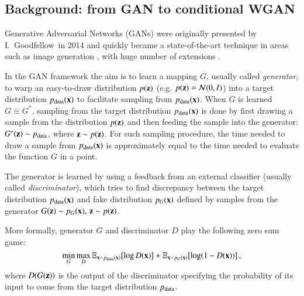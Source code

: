 \subsection{Background: from GAN to conditional WGAN}

Generative Adversarial Networks (GANs) were originally presented by I.~Goodfellow~\etal in 2014 \cite{goodfellow2014generative} and quickly became a state-of-the-art technique in areas such as image generation \cite{radford2015unsupervised}, with huge number of extensions \cite{IsolaZZE16,CycleGAN2017,wang2018video}.

In the GAN framework the aim is to learn a mapping $G$, usually called \textit{generator}, to warp an easy-to-draw distribution $p(\mathbf{z})$ (e.g. $p(\mathbf{z}) = \mathcal{N}(0, I)$) into a target distribution $p_{\text{data}}(\mathbf{x})$ to facilitate sampling from $p_{\text{data}}(\mathbf{x})$. When $G$ is learned $G \equiv G^*$, sampling from the target distribution $p_{\text{data}}(\mathbf{x})$ is done by first drawing a sample from the distribution $p(\mathbf{z})$ and then feeding the sample into the generator: $G^*(\mathbf{z}) \sim p_{\text{data}}$, where $\mathbf{z} \sim p(\mathbf{z})$. For such sampling procedure, the time needed to draw a sample from $p_{\text{data}}(\mathbf{x})$ is approximately equal to the time needed to evaluate the function $G$ in a point.  

The generator is learned by using a feedback from an external classifier (usually called \textit{discriminator}), which tries to find discrepancy between the target distribution $p_{\text{data}}(\mathbf{x})$ and fake distribution $ p_{G} (\mathbf{x})$ defined by samples from the generator $G(\mathbf{z}) \sim  p_{G} (\mathbf{x}),\, \mathbf{z} \sim p(\mathbf{z})$. %



More formally, generator $G$ and discriminator $D$ play the following zero sum game: 
\begin{equation}\label{eq:gan}
\min_G \max_D \mathbb{E}_{\mathbf{x} \sim p_{\text{data}}(\mathbf{x})} [\log D(\mathbf{x})] + \mathbb{E}_{\mathbf{x} \sim  p_{G} (\mathbf{x})} [\log(1 - D(\mathbf{x}))]\, ,
\end{equation} 
where $D(G(\mathbf{z}))$ is the output of the discriminator specifying the probability of its input to come from the target distribution $p_{\text{data}}$.

